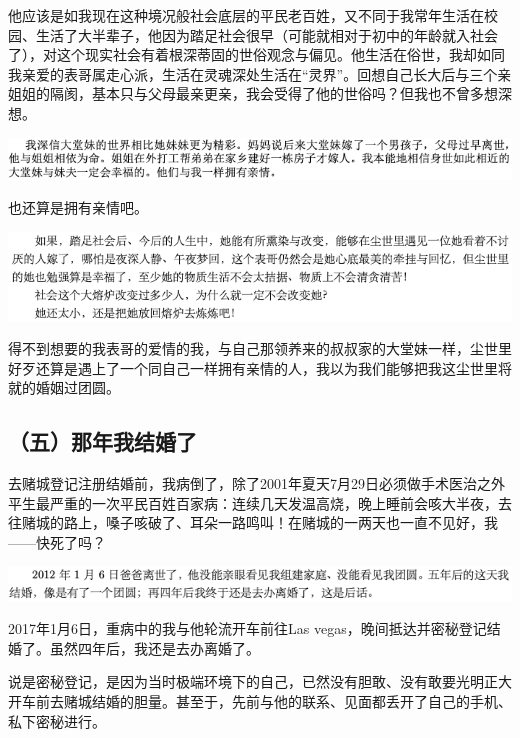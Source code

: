 \documentclass[9pt, b5paper]{article}
\begin{document}
他应该是如我现在这种境况般社会底层的平民老百姓，又不同于我常年生活在校园、生活了大半辈子，他因为踏足社会很早（可能就相对于初中的年龄就入社会了），对这个现实社会有着根深蒂固的世俗观念与偏见。他生活在俗世，我却如同我亲爱的表哥属走心派，生活在灵魂深处生活在“灵界”。回想自己长大后与三个亲姐姐的隔阂，基本只与父母最亲更亲，我会受得了他的世俗吗？但我也不曾多想深想。 

\begin{center}
\includegraphics[width=.9\linewidth]{./pic/backups_plans_20210423_211802.png}
\end{center}

也还算是拥有亲情吧。

\begin{center}
\includegraphics[width=.9\linewidth]{./pic/backups_plans_20210423_213157.png}
\end{center}

得不到想要的我表哥的爱情的我，与自己那领养来的叔叔家的大堂妹一样，尘世里好歹还算是遇上了一个同自己一样拥有亲情的人，我以为我们能够把我这尘世里将就的婚姻过团圆。

\subsection{（五）那年我结婚了}
\label{sec:orgecf2ea6}

去赌城登记注册结婚前，我病倒了，除了2001年夏天7月29日必须做手术医治之外平生最严重的一次平民百姓百家病：连续几天发温高烧，晚上睡前会咳大半夜，去往赌城的路上，嗓子咳破了、耳朵一路鸣叫！在赌城的一两天也一直不见好，我——快死了吗？

\begin{center}
\includegraphics[width=.9\linewidth]{./pic/backups_plans_20210423_213744.png}
\end{center}

2017年1月6日，重病中的我与他轮流开车前往Las vegas，晚间抵达并密秘登记结婚了。虽然四年后，我还是去办离婚了。

说是密秘登记，是因为当时极端环境下的自己，已然没有胆敢、没有敢要光明正大开车前去赌城结婚的胆量。甚至于，先前与他的联系、见面都丢开了自己的手机、私下密秘进行。
\end{document}
